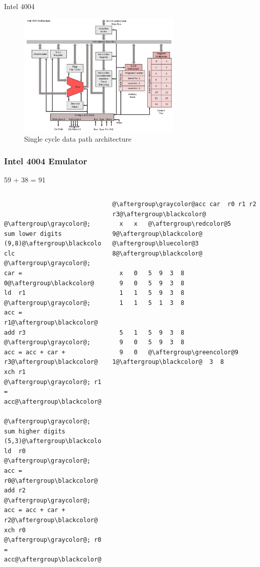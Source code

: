 \documentclass[xcolor=dvipsnames]{beamer}
\begin{document}
\begin{frame}{Intel 4004}
\begin{figure}
  \centering
  \caption {Single cycle data path architecture}
  \includegraphics[width=0.7\textwidth]{intel_4004_architecture}
\end{figure}
\end{frame}


\begin{frame}[fragile]
  \frametitle{Intel 4004 Emulator}
  \centering
  {\color{red}59} + {\color{blue}38} = {\color{OliveGreen}91}
\begin{columns}
\centering
\begin{lstlisting}


@\aftergroup\graycolor@; sum lower digits (9,8)@\aftergroup\blackcolor@
clc    @\aftergroup\graycolor@; car = 0@\aftergroup\blackcolor@
ld  r1 @\aftergroup\graycolor@; acc = r1@\aftergroup\blackcolor@
add r3 @\aftergroup\graycolor@; acc = acc + car + r3@\aftergroup\blackcolor@
xch r1 @\aftergroup\graycolor@; r1  = acc@\aftergroup\blackcolor@

@\aftergroup\graycolor@; sum higher digits (5,3)@\aftergroup\blackcolor@
ld  r0 @\aftergroup\graycolor@; acc = r0@\aftergroup\blackcolor@
add r2 @\aftergroup\graycolor@; acc = acc + car + r2@\aftergroup\blackcolor@
xch r0 @\aftergroup\graycolor@; r0  = acc@\aftergroup\blackcolor@
\end{lstlisting}
\centering
\begin{lstlisting}
@\aftergroup\graycolor@acc car  r0 r1 r2 r3@\aftergroup\blackcolor@
  x   x   @\aftergroup\redcolor@5  9@\aftergroup\blackcolor@  @\aftergroup\bluecolor@3  8@\aftergroup\blackcolor@

  x   0   5  9  3  8
  9   0   5  9  3  8
  1   1   5  9  3  8
  1   1   5  1  3  8


  5   1   5  9  3  8
  9   0   5  9  3  8
  9   0   @\aftergroup\greencolor@9  1@\aftergroup\blackcolor@  3  8
\end{lstlisting}
\end{columns}
\end{frame}
\end{document}
